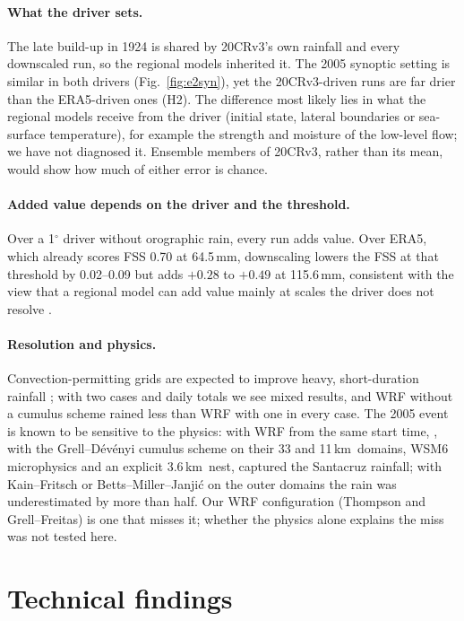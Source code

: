 \documentclass[11pt,a4paper]{article}
\newcommand{\twcr}{20CRv3}
\newcommand{\km}{\,km}
\newcommand{\mm}{\,mm}
\begin{document}
\paragraph{What the driver sets.} The late build-up in 1924 is shared by \twcr's own
rainfall and every downscaled run, so the regional models inherited it. The 2005 synoptic
setting is similar in both drivers (Fig.~\ref{fig:e2syn}), yet the \twcr-driven runs are
far drier than the ERA5-driven ones (H2). The difference most likely lies in what the
regional models receive from the driver (initial state, lateral boundaries or sea-surface
temperature), for example the strength and moisture of the low-level flow; we have not
diagnosed it. Ensemble
members of \twcr, rather than its mean, would show how much of either error is chance.

\paragraph{Added value depends on the driver and the threshold.} Over a 1$^\circ$ driver
without orographic rain, every run adds value. Over ERA5, which already scores FSS 0.70 at
64.5\mm, downscaling lowers the FSS at that threshold by 0.02--0.09 but adds $+0.28$ to
$+0.49$ at 115.6\mm, consistent with the view that a regional model can add value mainly at scales the
driver does not resolve \citep{diluca2012}.

\paragraph{Resolution and physics.} Convection-permitting grids are expected to improve
heavy, short-duration rainfall \citep{prein2015}; with two cases and daily totals we see
mixed results, and WRF without a cumulus scheme rained less than WRF with one in every case.
The 2005 event is known to be sensitive to the physics: with WRF from the same start time,
\citet{kumar2008}, with the Grell--Dévényi cumulus scheme \citep{grell2002} on their 33 and
11\km\ domains, WSM6 microphysics and an explicit 3.6\km\ nest, captured the Santacruz
rainfall; with Kain--Fritsch or Betts--Miller--Janjić on the outer domains the rain was
underestimated by more than half. Our WRF
configuration (Thompson and Grell--Freitas) is one that misses it; whether the physics alone
explains the miss was not tested here.

\section{Technical findings}
\end{document}
